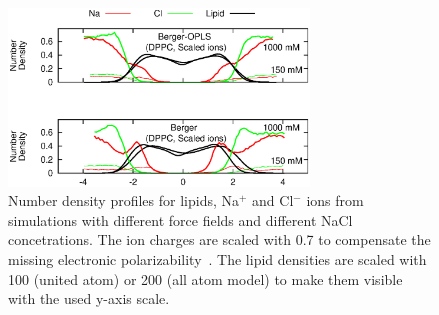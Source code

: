 \documentclass[pre,aps,floatfix,authordate1-4,twocolumn]{revtex4-1}
\begin{document}
\begin{figure}[]
  \centering
  \includegraphics[width=8cm]{../Fig/NAdensitiesSCALED.eps} %
  \caption{\label{NAdensitySCALED}
    Number density profiles for lipids, Na$^+$ and Cl$^-$ ions from simulations with different force fields and different NaCl concetrations. 
    The ion charges are scaled with 0.7 to compensate the missing electronic polarizability~\cite{leontyev11}.
    The lipid densities are scaled with 100 (united atom) or 200 (all atom model) to make them visible with the used y-axis scale.
}
\end{figure}



\end{document}
